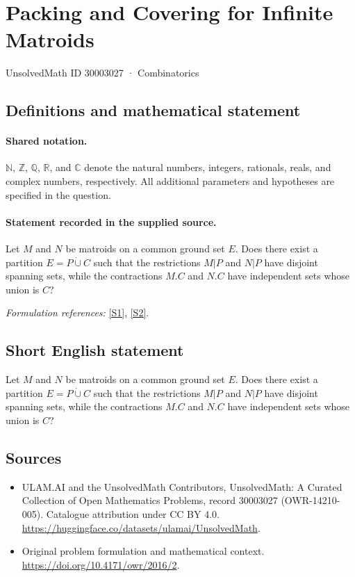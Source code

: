 \documentclass[11pt]{article}
\newcommand{\sref}[2]{\hyperlink{source:#1:#2}{[S#2]}}
\begin{document}
\setcounter{section}{30003026}
\section{Packing and Covering for Infinite Matroids}\label{30003027}
{\small UnsolvedMath ID 30003027 · Combinatorics}
\subsection{Definitions and mathematical statement}

\paragraph{Shared notation.}$\mathbb N$, $\mathbb Z$, $\mathbb Q$, $\mathbb R$, and $\mathbb C$ denote the natural numbers, integers, rationals, reals, and complex numbers, respectively. All additional parameters and hypotheses are specified in the question.


\paragraph{Statement recorded in the supplied source.}
Let $M$ and $N$ be matroids on a common ground set $E$. Does there exist a partition $E=P\mathbin{\dot\cup}C$ such that the restrictions $M|P$ and $N|P$ have disjoint spanning sets, while the contractions $M.C$ and $N.C$ have independent sets whose union is $C$?
\par\smallskip\textit{Formulation references:} \sref{30003027}{1}, \sref{30003027}{2}.
\subsection{Short English statement}
Let $M$ and $N$ be matroids on a common ground set $E$. Does there exist a partition $E=P\mathbin{\dot\cup}C$ such that the restrictions $M|P$ and $N|P$ have disjoint spanning sets, while the contractions $M.C$ and $N.C$ have independent sets whose union is $C$?
\subsection{Sources}
\begin{itemize}
\item[\hypertarget{source:30003027:1}{S1}] ULAM.AI and the UnsolvedMath Contributors, UnsolvedMath: A Curated Collection of Open Mathematics Problems, record 30003027 (OWR-14210-005). Catalogue attribution under CC BY 4.0.
\url{https://huggingface.co/datasets/ulamai/UnsolvedMath}.
\item[\hypertarget{source:30003027:2}{S2}] Original problem formulation and mathematical context.
\url{https://doi.org/10.4171/owr/2016/2}.
\end{itemize}
\label{end:30003027}
\end{document}

